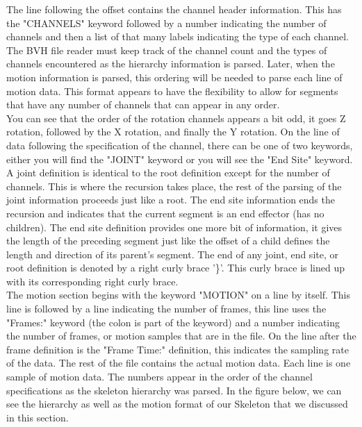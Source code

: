 The line following the offset contains the channel header information. This has the "CHANNELS" keyword followed by a number indicating the number of channels and then a list of that many labels indicating the type of each channel. The BVH file reader must keep track of the channel count and the types of channels encountered as the hierarchy information is parsed. Later, when the motion information is parsed, this ordering will be needed to parse each line of motion data. This format appears to have the flexibility to allow for segments that have any number of channels that can appear in any order.\\

You can see that the order of the rotation channels appears a bit odd, it goes Z rotation, followed by the X rotation, and finally the Y rotation. On the line of data following the specification of the channel, there can be one of two keywords, either you will find the "JOINT" keyword or you will see the "End Site" keyword. A joint definition is identical to the root definition except for the number of channels. This is where the recursion takes place, the rest of the parsing of the joint information proceeds just like a root. The end site information ends the recursion and indicates that the current segment is an end effector (has no children). The end site definition provides one more bit of information, it gives the length of the preceding segment just like the offset of a child defines the length and direction of its parent's segment. The end of any joint, end site, or root definition is denoted by a right curly brace '\}'. This curly brace is lined up with its corresponding right curly brace.\\

The motion section begins with the keyword "MOTION" on a line by itself. This line is followed by a line indicating the number of frames, this line uses the "Frames:" keyword (the colon is part of the keyword) and a number indicating the number of frames, or motion samples that are in the file. On the line after the frame definition is the "Frame Time:" definition, this indicates the sampling rate of the data. The rest of the file contains the actual motion data. Each line is one sample of motion data. The numbers appear in the order of the channel specifications as the skeleton hierarchy was parsed. In the figure below, we can see the hierarchy as well as the motion format of our Skeleton that we discussed in this section.


